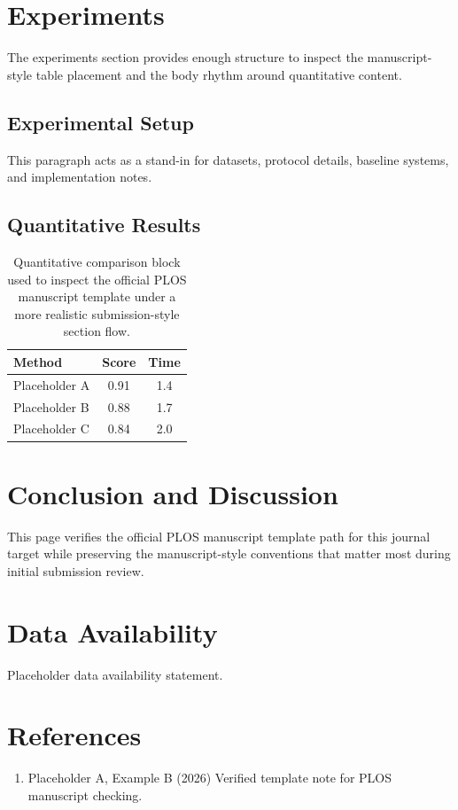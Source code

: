 \documentclass[10pt,letterpaper]{article}
\begin{document}
\section{Experiments}
The experiments section provides enough structure to inspect the manuscript-style table placement and the body rhythm around quantitative content.
\subsection{Experimental Setup}
This paragraph acts as a stand-in for datasets, protocol details, baseline systems, and implementation notes.
\subsection{Quantitative Results}
\begin{table}[!ht]
\caption{Quantitative comparison block used to inspect the official PLOS manuscript template under a more realistic submission-style section flow.}
\centering
\begin{tabular}{lcc}
\hline
Method & Score & Time\\
\hline
Placeholder A & 0.91 & 1.4\\
Placeholder B & 0.88 & 1.7\\
Placeholder C & 0.84 & 2.0\\
\hline
\end{tabular}
\end{table}
\section{Conclusion and Discussion}
This page verifies the official PLOS manuscript template path for this journal target while preserving the manuscript-style conventions that matter most during initial submission review.
\section*{Data Availability}
Placeholder data availability statement.
\section*{References}
\begin{enumerate}
\item Placeholder A, Example B (2026) Verified template note for PLOS manuscript checking.
\end{enumerate}
\end{document}
